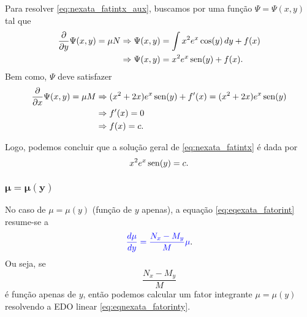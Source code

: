 \begin{ex}
  Para resolver \eqref{eq:nexata_fatintx_aux}, buscamos por uma função $\Psi = \Psi(x,y)$ tal que
  \begin{align}
    \frac{\partial}{\partial y}\Psi(x,y) = \mu N &\Rightarrow \Psi(x,y) = \int x^2e^x\cos(y)\,dy + f(x) \\
                                     &\Rightarrow \Psi(x,y) = x^2e^x\operatorname{sen}(y) + f(x).
  \end{align}
  Bem como, $\Psi$ deve satisfazer
  \begin{align}
    \frac{\partial}{\partial x}\Psi(x,y) = \mu M &\Rightarrow (x^2 + 2x)e^x\operatorname{sen}(y) + f'(x) = (x^2 + 2x)e^x\operatorname{sen}(y) \\
                                     &\Rightarrow f'(x) = 0 \\
                                     &\Rightarrow f(x) = c.
  \end{align}

  Logo, podemos concluir que a solução geral de \eqref{eq:nexata_fatintx}  é dada por
  \begin{equation}
    x^2e^x\operatorname{sen}(y) = c.  
  \end{equation}
\end{ex}

\subsubsection{$\pmb{\mu = \mu(y)}$}

No caso de $\mu = \mu(y)$ (função de $y$ apenas), a equação \eqref{eq:eqexata_fatorint} resume-se a
\begin{equation}\label{eq:eqnexata_fatorinty}
  {\color{blue}\frac{d\mu}{dy} = \frac{N_x-M_y}{M}\mu}.
\end{equation}
Ou seja, se
\begin{equation}
  \frac{N_x-M_y}{M}
\end{equation}
é função apenas de $y$, então podemos calcular um fator integrante $\mu = \mu(y)$ resolvendo a EDO linear \eqref{eq:eqnexata_fatorinty}.

